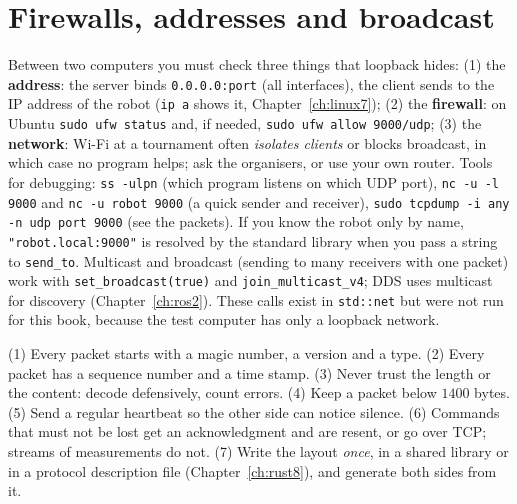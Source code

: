 \section*{Firewalls, addresses and broadcast}
Between two computers you must check three things that loopback hides: (1) the \textbf{address}: the server binds \verb!0.0.0.0:port! (all interfaces), the client sends to the IP address of the robot (\verb!ip a! shows it, Chapter~\ref{ch:linux7}); (2) the \textbf{firewall}: on Ubuntu \verb!sudo ufw status! and, if needed, \verb!sudo ufw allow 9000/udp!; (3) the \textbf{network}: Wi-Fi at a tournament often \emph{isolates clients} or blocks broadcast, in which case no program helps; ask the organisers, or use your own router. Tools for debugging: \verb!ss -ulpn! (which program listens on which UDP port), \verb!nc -u -l 9000! and \verb!nc -u robot 9000! (a quick sender and receiver), \verb!sudo tcpdump -i any -n udp port 9000! (see the packets). If you know the robot only by name, \verb!"robot.local:9000"! is resolved by the standard library when you pass a string to \verb!send_to!. Multicast and broadcast (sending to many receivers with one packet) work with \verb!set_broadcast(true)! and \verb!join_multicast_v4!; DDS uses multicast for discovery (Chapter~\ref{ch:ros2}). These calls exist in \verb!std::net! but were not run for this book, because the test computer has only a loopback network.

\begin{aibox}
(1) Every packet starts with a magic number, a version and a type. (2) Every packet has a sequence number and a time stamp. (3) Never trust the length or the content: decode defensively, count errors. (4) Keep a packet below $1400$ bytes. (5) Send a regular heartbeat so the other side can notice silence. (6) Commands that must not be lost get an acknowledgment and are resent, or go over TCP; streams of measurements do not. (7) Write the layout \emph{once}, in a shared library or in a protocol description file (Chapter~\ref{ch:rust8}), and generate both sides from it.
\end{aibox}

